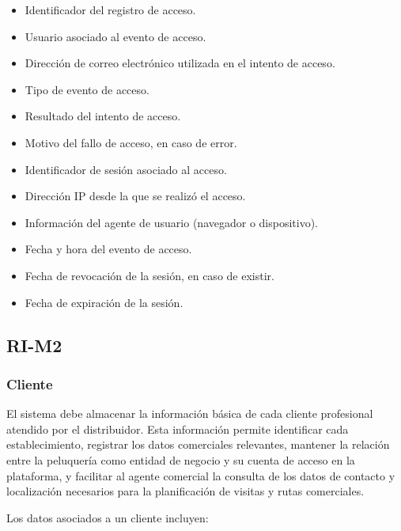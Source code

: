 \begin{itemize}
    \item Identificador del registro de acceso.
    \item Usuario asociado al evento de acceso.
    \item Dirección de correo electrónico utilizada en el intento de acceso.
    \item Tipo de evento de acceso.
    \item Resultado del intento de acceso.
    \item Motivo del fallo de acceso, en caso de error.
    \item Identificador de sesión asociado al acceso.
    \item Dirección IP desde la que se realizó el acceso.
    \item Información del agente de usuario (navegador o dispositivo).
    \item Fecha y hora del evento de acceso.
    \item Fecha de revocación de la sesión, en caso de existir.
    \item Fecha de expiración de la sesión.
\end{itemize}

\subsection{RI-M2}

\subsubsection*{Cliente}

El sistema debe almacenar la información básica de cada cliente profesional atendido por el distribuidor. Esta información permite identificar cada establecimiento, registrar los datos comerciales relevantes, mantener la relación entre la peluquería como entidad de negocio y su cuenta de acceso en la plataforma, y facilitar al agente comercial la consulta de los datos de contacto y localización necesarios para la planificación de visitas y rutas comerciales.

Los datos asociados a un cliente incluyen:

